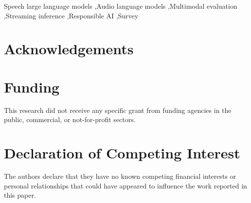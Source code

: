 \documentclass[a4paper,fleqn]{cas-sc}
\begin{document}
\begin{keywords}
Speech large language models \sep Audio language models \sep Multimodal evaluation \sep Streaming inference \sep Responsible AI \sep Survey
\end{keywords}

\maketitle

\section*{Acknowledgements}

\section*{Funding}
This research did not receive any specific grant from funding agencies in the public, commercial, or not-for-profit sectors.

\section*{Declaration of Competing Interest}
The authors declare that they have no known competing financial interests or personal relationships that could have appeared to influence the work reported in this paper.

\printcredits
\end{document}
